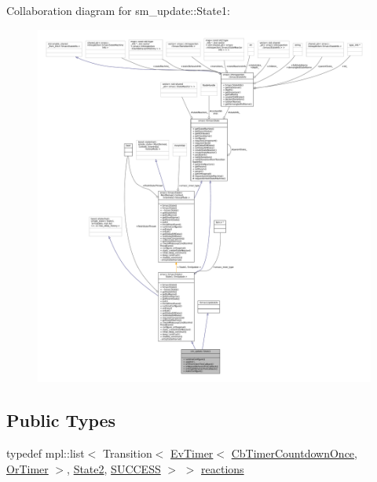Collaboration diagram for sm\+\_\+update\+:\+:State1\+:
\nopagebreak
\begin{figure}[H]
\begin{center}
\leavevmode
\includegraphics[width=350pt]{structsm__update_1_1State1__coll__graph}
\end{center}
\end{figure}
\subsection*{Public Types}
\begin{DoxyCompactItemize}
\item 
typedef mpl\+::list$<$ Transition$<$ \hyperlink{structros__timer__client_1_1EvTimer}{Ev\+Timer}$<$ \hyperlink{classros__timer__client_1_1CbTimerCountdownOnce}{Cb\+Timer\+Countdown\+Once}, \hyperlink{classsm__update_1_1OrTimer}{Or\+Timer} $>$, \hyperlink{structsm__update_1_1State2}{State2}, \hyperlink{structsmacc_1_1default__transition__tags_1_1SUCCESS}{S\+U\+C\+C\+E\+SS} $>$ $>$ \hyperlink{structsm__update_1_1State1_afecf0d56718ca6d3f567b2abf23641d8}{reactions}
\end{DoxyCompactItemize}
